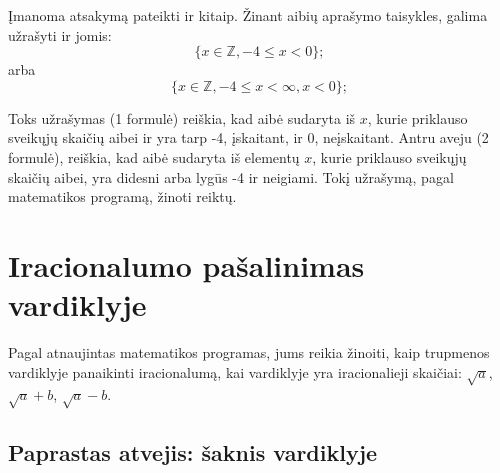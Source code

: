 \documentclass[a4paper]{article}
\begin{document}
Įmanoma atsakymą pateikti ir kitaip. Žinant aibių aprašymo taisykles, galima
užrašyti ir jomis:
\begin{equation}
      \{x \in \mathbb{Z}, -4 \leq x < 0\};
\end{equation}
arba
\begin{equation}
      \{x \in \mathbb{Z}, -4 \leq x < \infty, x < 0\};
\end{equation}

Toks užrašymas (1 formulė) reiškia, kad aibė sudaryta iš $x$, kurie priklauso
sveikųjų skaičių aibei ir yra tarp -4, įskaitant,
ir 0, neįskaitant. Antru aveju (2 formulė), reiškia, kad aibė sudaryta iš
elementų $x$, kurie priklauso sveikųjų skaičių aibei, yra didesni arba lygūs -4
ir neigiami. Tokį užrašymą, pagal matematikos programą, žinoti reiktų.

\section{Iracionalumo pašalinimas vardiklyje}

Pagal atnaujintas matematikos programas, jums reikia žinoiti, kaip trupmenos
vardiklyje panaikinti iracionalumą, kai vardiklyje yra iracionalieji skaičiai:
$\sqrt{a}$, $\sqrt{a}+b$, $\sqrt{a}-b$.

\subsection{Paprastas atvejis: šaknis vardiklyje}



\clearpage



\end{document}
